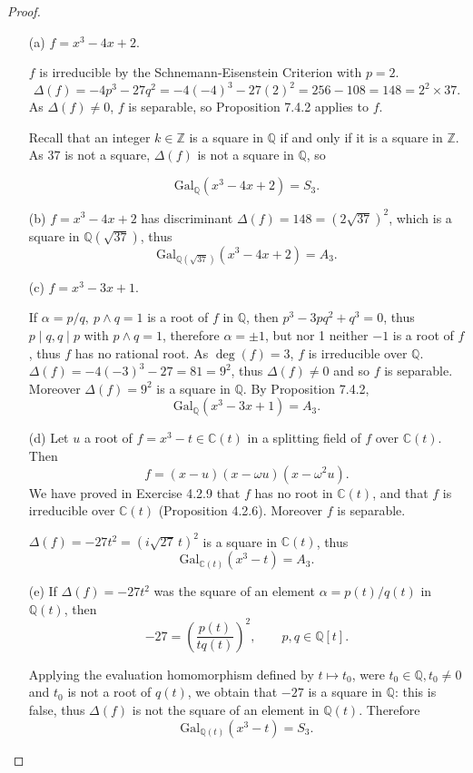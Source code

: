 \documentclass[11pt,a4paper]{article}
\newcommand{\Q}{\mathbb{Q}}
\newcommand{\Z}{\mathbb{Z}}
\newcommand{\C}{\mathbb{C}}
\newcommand{\Gal}{\mathrm{Gal}}
\begin{document}
\begin{proof}
\begin{enumerate}
\item[(a)]
$f= x^3-4x+2.$

$f$ is irreducible by the Schnemann-Eisenstein Criterion with $p = 2$.
$$ \Delta(f) = -4p^3-27q^2 = -4(-4)^3 - 27(2)^2 = 256 -108 = 148 = 2^2\times 37 .$$
As $\Delta(f) \ne 0$, $f$ is separable, so Proposition 7.4.2 applies to $f$.

Recall that an integer $k\in \Z$ is a square in $\Q$ if and only if it is a square in $\Z$. As $37$ is not a square, $\Delta(f)$ is not a square in $\Q$, so

$$\Gal_\Q(x^3-4x+2) =S_3.$$

\item[(b)] $f= x^3-4x+2$ has discriminant $\Delta(f) = 148 =(2 \sqrt{37})^2$, which is a square in  $\Q(\sqrt{37})$, thus
$$\Gal_{\Q(\sqrt{37})}( x^3-4x+2) = A_3.$$

\item[(c)] $f=x^3-3x+1$.

If $\alpha = p/q,\ p\wedge q=1$ is a root of $f$ in $\Q$, then $p^3 - 3 pq^2+q^3 = 0$, thus $p \mid q, q\mid p$ with $p\wedge q = 1$, therefore $\alpha = \pm1$, but nor 1 neither $-1$ is a root of $f$, thus $f$ has no rational root. As $\deg(f) = 3$, $f$ is irreducible over $\Q$.
$\Delta(f) = -4(-3)^3 - 27 = 81 = 9^2$, thus $\Delta (f) \ne 0$ and so $f$ is separable. Moreover $\Delta(f) = 9^2$ is a square in  $\Q$. By Proposition 7.4.2,
$$\Gal_{\Q}(x^3-3x+1) = A_3.$$

\item[(d)]
Let $u$ a root of $f = x^3 - t \in \C(t)$ in a splitting field of $f$ over $\C(t)$. Then
$$f = (x-u)(x-\omega u)(x-\omega^2u).$$
We have proved in Exercise 4.2.9 that $f$ has no root in $\C(t)$, and that $f$ is irreducible over $\C(t)$ (Proposition 4.2.6). Moreover $f$ is separable.

$\Delta(f) = -27 t^2 = (i\sqrt{27}\,  t)^2$ is a square in $\C(t)$, thus
$$\Gal_{\C(t)}(x^3-t) = A_3.$$

\item[(e)]
If $\Delta(f) = -27 t^2$ was the square of an element $\alpha = p(t)/q(t)$ in $\Q(t)$, then $$-27 = \left(\frac{p(t)}{tq(t)}\right)^2,\qquad p,q \in \Q[t].$$

Applying the evaluation homomorphism defined by $t\mapsto t_0$, were $t_0\in \Q,t_0\neq 0$ and $t_0$ is not a root of $q(t)$, we obtain that $-27$ is a square in $\Q$: this is false, thus $\Delta(f)$ is not the square of an element in $\Q(t)$. Therefore
$$\Gal_{\Q(t)}(x^3-t) = S_3.$$
\end{enumerate}
\end{proof}
\end{document}
